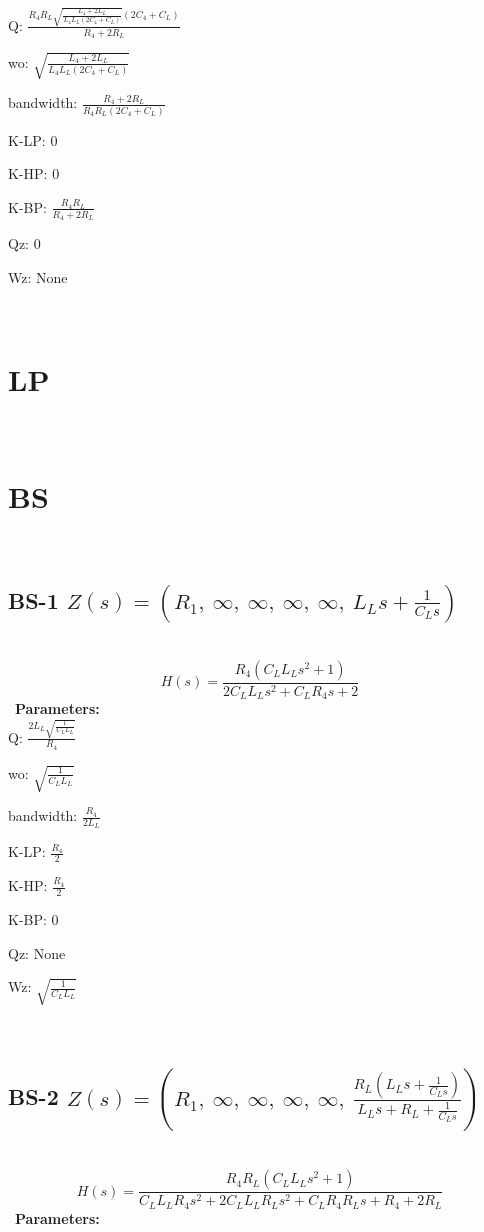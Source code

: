 \documentclass{article}
\begin{document}
Q: $\frac{R_{4} R_{L} \sqrt{\frac{L_{4} + 2 L_{L}}{L_{4} L_{L} \left(2 C_{4} + C_{L}\right)}} \left(2 C_{4} + C_{L}\right)}{R_{4} + 2 R_{L}}$\ 

wo: $\sqrt{\frac{L_{4} + 2 L_{L}}{L_{4} L_{L} \left(2 C_{4} + C_{L}\right)}}$\ 

bandwidth: $\frac{R_{4} + 2 R_{L}}{R_{4} R_{L} \left(2 C_{4} + C_{L}\right)}$\ 

K-LP: $0$\ 

K-HP: $0$\ 

K-BP: $\frac{R_{4} R_{L}}{R_{4} + 2 R_{L}}$\ 

Qz: $0$\ 

Wz: $\text{None}$\ 

\ 

\section{LP}\ 
\section{BS}\ 
\subsection{BS-1 $Z(s) = \left( R_{1}, \  \infty, \  \infty, \  \infty, \  \infty, \  L_{L} s + \frac{1}{C_{L} s}\right)$ } \ 
\textbf{\[H(s) = \frac{R_{4} \left(C_{L} L_{L} s^{2} + 1\right)}{2 C_{L} L_{L} s^{2} + C_{L} R_{4} s + 2}\] } \ 
\textbf{Parameters:}\\ 

Q: $\frac{2 L_{L} \sqrt{\frac{1}{C_{L} L_{L}}}}{R_{4}}$\ 

wo: $\sqrt{\frac{1}{C_{L} L_{L}}}$\ 

bandwidth: $\frac{R_{4}}{2 L_{L}}$\ 

K-LP: $\frac{R_{4}}{2}$\ 

K-HP: $\frac{R_{4}}{2}$\ 

K-BP: $0$\ 

Qz: $\text{None}$\ 

Wz: $\sqrt{\frac{1}{C_{L} L_{L}}}$\ 

\ 

\subsection{BS-2 $Z(s) = \left( R_{1}, \  \infty, \  \infty, \  \infty, \  \infty, \  \frac{R_{L} \left(L_{L} s + \frac{1}{C_{L} s}\right)}{L_{L} s + R_{L} + \frac{1}{C_{L} s}}\right)$ } \ 
\textbf{\[H(s) = \frac{R_{4} R_{L} \left(C_{L} L_{L} s^{2} + 1\right)}{C_{L} L_{L} R_{4} s^{2} + 2 C_{L} L_{L} R_{L} s^{2} + C_{L} R_{4} R_{L} s + R_{4} + 2 R_{L}}\] } \ 
\textbf{Parameters:}\\ 
\end{document}
